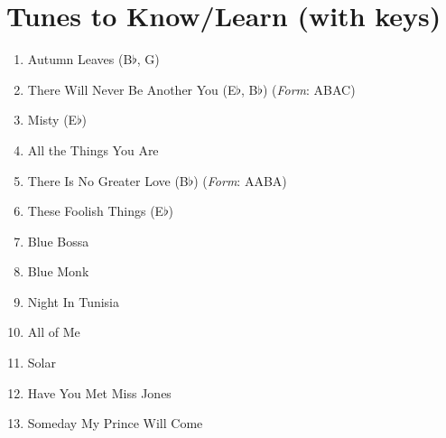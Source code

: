 \documentclass[10pt,a4paper]{article}
\begin{document}
\section{Tunes to Know/Learn (with keys)}

\begin{enumerate}
    \item Autumn Leaves (B$\flat$, G)
    \item There Will Never Be Another You (E$\flat$, B$\flat$) (\textit{Form}: ABAC)
    \item Misty (E$\flat$)
    \item All the Things You Are
    \item There Is No Greater Love (B$\flat$) (\textit{Form}: AABA)
    \item These Foolish Things (E$\flat$)
    \item Blue Bossa
    \item Blue Monk
    \item Night In Tunisia
    \item All of Me
    \item Solar
    \item Have You Met Miss Jones
    \item Someday My Prince Will Come

\end{enumerate}
\end{document}
